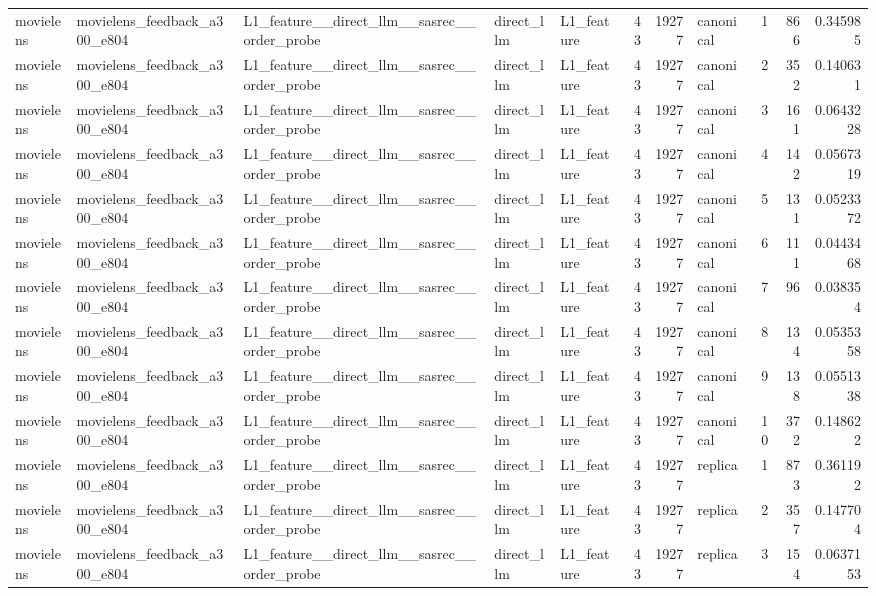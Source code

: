 \begin{table}[htbp!]
\begin{tabular}{lllllrrlrrr}
movielens & movielens\_feedback\_a300\_e804 & L1\_feature\_\_direct\_llm\_\_sasrec\_\_order\_probe & direct\_llm & L1\_feature & 43 & 19277 & canonical & 1 & 866 & 0.345985 \\
movielens & movielens\_feedback\_a300\_e804 & L1\_feature\_\_direct\_llm\_\_sasrec\_\_order\_probe & direct\_llm & L1\_feature & 43 & 19277 & canonical & 2 & 352 & 0.140631 \\
movielens & movielens\_feedback\_a300\_e804 & L1\_feature\_\_direct\_llm\_\_sasrec\_\_order\_probe & direct\_llm & L1\_feature & 43 & 19277 & canonical & 3 & 161 & 0.0643228 \\
movielens & movielens\_feedback\_a300\_e804 & L1\_feature\_\_direct\_llm\_\_sasrec\_\_order\_probe & direct\_llm & L1\_feature & 43 & 19277 & canonical & 4 & 142 & 0.0567319 \\
movielens & movielens\_feedback\_a300\_e804 & L1\_feature\_\_direct\_llm\_\_sasrec\_\_order\_probe & direct\_llm & L1\_feature & 43 & 19277 & canonical & 5 & 131 & 0.0523372 \\
movielens & movielens\_feedback\_a300\_e804 & L1\_feature\_\_direct\_llm\_\_sasrec\_\_order\_probe & direct\_llm & L1\_feature & 43 & 19277 & canonical & 6 & 111 & 0.0443468 \\
movielens & movielens\_feedback\_a300\_e804 & L1\_feature\_\_direct\_llm\_\_sasrec\_\_order\_probe & direct\_llm & L1\_feature & 43 & 19277 & canonical & 7 & 96 & 0.038354 \\
movielens & movielens\_feedback\_a300\_e804 & L1\_feature\_\_direct\_llm\_\_sasrec\_\_order\_probe & direct\_llm & L1\_feature & 43 & 19277 & canonical & 8 & 134 & 0.0535358 \\
movielens & movielens\_feedback\_a300\_e804 & L1\_feature\_\_direct\_llm\_\_sasrec\_\_order\_probe & direct\_llm & L1\_feature & 43 & 19277 & canonical & 9 & 138 & 0.0551338 \\
movielens & movielens\_feedback\_a300\_e804 & L1\_feature\_\_direct\_llm\_\_sasrec\_\_order\_probe & direct\_llm & L1\_feature & 43 & 19277 & canonical & 10 & 372 & 0.148622 \\
movielens & movielens\_feedback\_a300\_e804 & L1\_feature\_\_direct\_llm\_\_sasrec\_\_order\_probe & direct\_llm & L1\_feature & 43 & 19277 & replica & 1 & 873 & 0.361192 \\
movielens & movielens\_feedback\_a300\_e804 & L1\_feature\_\_direct\_llm\_\_sasrec\_\_order\_probe & direct\_llm & L1\_feature & 43 & 19277 & replica & 2 & 357 & 0.147704 \\
movielens & movielens\_feedback\_a300\_e804 & L1\_feature\_\_direct\_llm\_\_sasrec\_\_order\_probe & direct\_llm & L1\_feature & 43 & 19277 & replica & 3 & 154 & 0.0637153 \\

\end{tabular}
\end{table}
